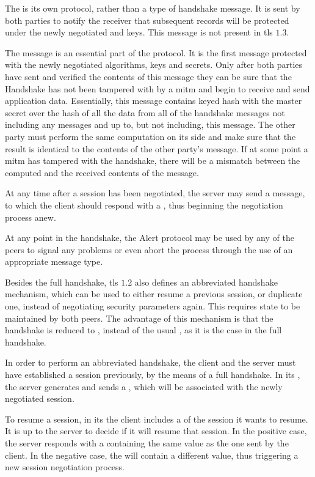 \documentclass{llncs}
\begin{document}
{The  is its own protocol, rather than a type of handshake
message. It is sent by both parties to notify the receiver that subsequent records
will be protected under the newly negotiated  and keys.
This message is not present in \gls{tls} $1.3$.

The  message is an essential part of the protocol. It is the first
message protected with the newly negotiated algorithms, keys and secrets. Only after
both parties have sent and verified the contents of this message they can
be sure that the Handshake has not been tampered with by a \gls{mitm} and begin to
receive and send application data. Essentially, this message contains keyed hash
with the master secret over the hash of all the data from all of the
handshake messages not including any  messages and up to, but
not including, this message. The other party must perform the same computation on its
side and make sure that the result is identical to the contents of the other party's
 message. If at some point a \gls{mitm} has tampered with the
handshake, there will be a mismatch between the computed and the received contents of the
 message.

At any time after a session has been negotiated, the server may send a 
message, to which the client should respond with a , thus
beginning the negotiation process anew.

At any point in the handshake, the Alert protocol may be used by any of the peers
to signal any problems or even abort the process through the use of an appropriate message type.

Besides the full handshake, \gls{tls} $1.2$ also defines an
abbreviated handshake mechanism, which can be used to either resume a previous session,
or duplicate one, instead of negotiating security parameters again. This
requires state to be maintained by both peers. The advantage of this mechanism is that the handshake is reduced
to , instead of the usual , as it is the case in the full handshake.

In order to perform an abbreviated handshake,
the client and the server must have established a session previously, by the
means of a full handshake. In its , the server generates and sends a , which will be associated with the newly negotiated session.

To resume a session, in its  the client includes a  of the session it wants to
resume. It is up to the server to decide if it
will resume that session. In the positive case, the server responds with a  containing
the same  value as the one sent by the client. In the negative
case, the  will contain a different  value, thus
triggering a new session negotiation process.

}
\end{document}
